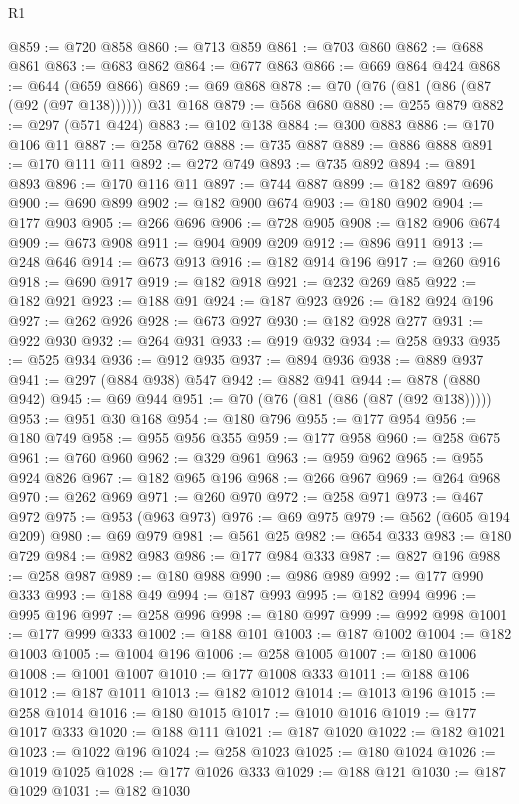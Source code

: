 \begin{lexlean}{R1}
\begin{coremodule}
@859 := @720 @858
@860 := @713 @859
@861 := @703 @860
@862 := @688 @861
@863 := @683 @862
@864 := @677 @863
@866 := @669 @864 @424
@868 := @644 (@659 @866)
@869 := @69 @868
@878 := @70 (@76 (@81 (@86 (@87 (@92 (@97 @138)))))) @31 @168
@879 := @568 @680
@880 := @255 @879
@882 := @297 (@571 @424)
@883 := @102 @138
@884 := @300 @883
@886 := @170 @106 @11
@887 := @258 @762
@888 := @735 @887
@889 := @886 @888
@891 := @170 @111 @11
@892 := @272 @749
@893 := @735 @892
@894 := @891 @893
@896 := @170 @116 @11
@897 := @744 @887
@899 := @182 @897 @696
@900 := @690 @899
@902 := @182 @900 @674
@903 := @180 @902
@904 := @177 @903
@905 := @266 @696
@906 := @728 @905
@908 := @182 @906 @674
@909 := @673 @908
@911 := @904 @909 @209
@912 := @896 @911
@913 := @248 @646
@914 := @673 @913
@916 := @182 @914 @196
@917 := @260 @916
@918 := @690 @917
@919 := @182 @918
@921 := @232 @269 @85
@922 := @182 @921
@923 := @188 @91
@924 := @187 @923
@926 := @182 @924 @196
@927 := @262 @926
@928 := @673 @927
@930 := @182 @928 @277
@931 := @922 @930
@932 := @264 @931
@933 := @919 @932
@934 := @258 @933
@935 := @525 @934
@936 := @912 @935
@937 := @894 @936
@938 := @889 @937
@941 := @297 (@884 @938) @547
@942 := @882 @941
@944 := @878 (@880 @942)
@945 := @69 @944
@951 := @70 (@76 (@81 (@86 (@87 (@92 @138)))))
@953 := @951 @30 @168
@954 := @180 @796
@955 := @177 @954
@956 := @180 @749
@958 := @955 @956 @355
@959 := @177 @958
@960 := @258 @675
@961 := @760 @960
@962 := @329 @961
@963 := @959 @962
@965 := @955 @924 @826
@967 := @182 @965 @196
@968 := @266 @967
@969 := @264 @968
@970 := @262 @969
@971 := @260 @970
@972 := @258 @971
@973 := @467 @972
@975 := @953 (@963 @973)
@976 := @69 @975
@979 := @562 (@605 @194 @209)
@980 := @69 @979
@981 := @561 @25
@982 := @654 @333
@983 := @180 @729
@984 := @982 @983
@986 := @177 @984 @333
@987 := @827 @196
@988 := @258 @987
@989 := @180 @988
@990 := @986 @989
@992 := @177 @990 @333
@993 := @188 @49
@994 := @187 @993
@995 := @182 @994
@996 := @995 @196
@997 := @258 @996
@998 := @180 @997
@999 := @992 @998
@1001 := @177 @999 @333
@1002 := @188 @101
@1003 := @187 @1002
@1004 := @182 @1003
@1005 := @1004 @196
@1006 := @258 @1005
@1007 := @180 @1006
@1008 := @1001 @1007
@1010 := @177 @1008 @333
@1011 := @188 @106
@1012 := @187 @1011
@1013 := @182 @1012
@1014 := @1013 @196
@1015 := @258 @1014
@1016 := @180 @1015
@1017 := @1010 @1016
@1019 := @177 @1017 @333
@1020 := @188 @111
@1021 := @187 @1020
@1022 := @182 @1021
@1023 := @1022 @196
@1024 := @258 @1023
@1025 := @180 @1024
@1026 := @1019 @1025
@1028 := @177 @1026 @333
@1029 := @188 @121
@1030 := @187 @1029
@1031 := @182 @1030

\end{coremodule}
\end{lexlean}
